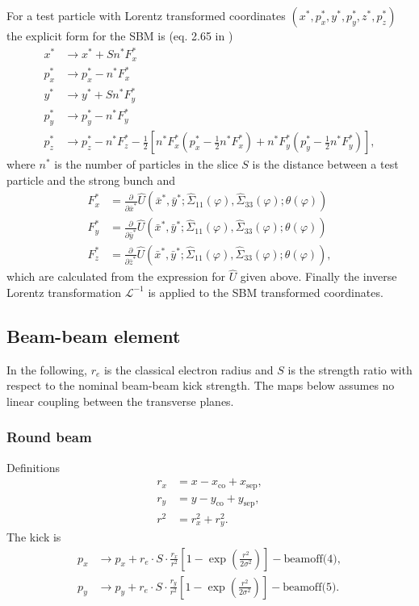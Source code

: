 \documentclass[english]{article}
\begin{document}
For a test particle with Lorentz transformed coordinates
$(x^*,p_x^*,y^*,p_y^*,z^*,p_z^*)$ the explicit form for the SBM is (eq. 2.65
in \cite{beam_beam})
\begin{align}
    x^* &\to x^* + Sn^*F_x^* \\
    p_x^* &\to p_x^*-n^*F_x^* \\
    y^* &\to y^* + Sn^*F_y^* \\
    p_y^* &\to p_y^* - n^*F_y^* \\
    p_z^* &\to p_z^* -n^*F_z^*- \frac{1}{2} 
    \left[n^*F_x^*(p_x^*-\frac{1}{2}n^*F_x^*)
    +n^*F_y^*(p_y^*-\frac{1}{2}n^*F_y^*)\right],
\end{align}
where $n^*$ is the number of particles in the slice $S$ is the distance between
a test particle and the strong bunch and
\begin{align}
    F_x^* &= \frac{\partial}{\partial\bar{x}^*} 
    \hat{U}(\bar{x}^*,\bar{y}^*;\hat{\Sigma}_{11}(\varphi),
    \hat{\Sigma}_{33}(\varphi);\theta(\varphi)) \\
    F_y^* &= \frac{\partial}{\partial\bar{y}^*} 
    \hat{U}(\bar{x}^*,\bar{y}^*;\hat{\Sigma}_{11}(\varphi),
    \hat{\Sigma}_{33}(\varphi);\theta(\varphi)) \\
    F_z^* &= \frac{\partial}{\partial\bar{z}^*} 
    \hat{U}(\bar{x}^*,\bar{y}^*;\hat{\Sigma}_{11}(\varphi),
    \hat{\Sigma}_{33}(\varphi);\theta(\varphi)),
\end{align}
which are calculated from the expression for $\hat{U}$ given above. Finally the
inverse Lorentz transformation $\mathcal{L}^{-1}$ is applied to the SBM transformed 
coordinates.

\subsection{Beam-beam element}
In the following, $r_e$ is the classical electron radius and $S$ is the strength ratio with respect to the nominal beam-beam kick strength. The maps below assumes no linear coupling between the transverse planes.

\subsubsection{Round beam}
Definitions
\begin{align}
	r_x &= x - x_{\text{co}} + x_{\text{sep}}, \\
    r_y &= y - y_{\text{co}} + y_{\text{sep}}, \\
    r^2 &= r_x^2+r_y^2.
\end{align}
The kick is
\begin{align}
	p_x &\to p_x + r_e\cdot S\cdot\frac{r_x}{r^2}\left[1-\exp\left(\frac{r^2}{2\sigma^2}\right)\right]-\text{beamoff(4)}, \\
    p_y &\to p_y + r_e\cdot S\cdot\frac{r_y}{r^2}\left[1-\exp\left(\frac{r^2}{2\sigma^2}\right)\right]-\text{beamoff(5)}.
\end{align}
\end{document}
